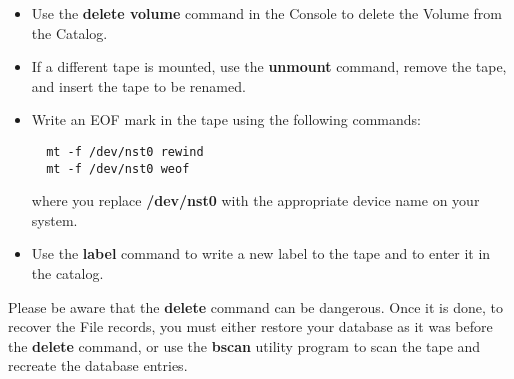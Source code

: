 \begin{itemize}
\item Use the {\bf delete volume} command in the Console  to delete the Volume
   from the Catalog.  
\item If a different tape is mounted, use the {\bf unmount}  command,
   remove the tape, and insert the tape to be  renamed.  
\item Write an EOF mark in the tape using the following  commands: 

\footnotesize
\begin{verbatim}
  mt -f /dev/nst0 rewind
  mt -f /dev/nst0 weof
\end{verbatim}
\normalsize

where you replace {\bf /dev/nst0} with the appropriate  device name on your
system.  
\item Use the {\bf label} command to write a new label to  the tape and to
   enter it in the catalog. 
\end{itemize}

Please be aware that the {\bf delete} command can be dangerous. Once it is
done, to recover the File records, you must either restore your database as it
was before the {\bf delete} command, or use the {\bf bscan} utility program to
scan the tape and recreate the database entries. 
